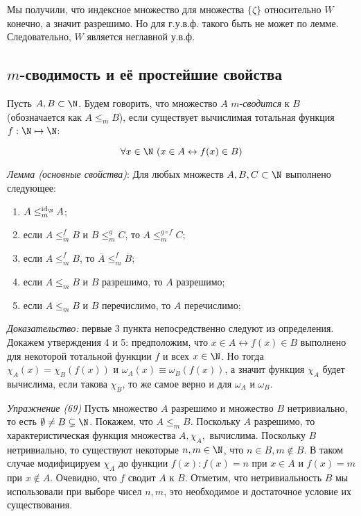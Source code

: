 \documentclass[a4paper, 10pt]{article}
\begin{document}
Мы получили, что индексное множество для множества $\{\zeta\}$ относительно $W$ конечно, а значит разрешимо. Но для г.у.в.ф. такого быть не может по лемме. Следовательно, $W$ является неглавной у.в.ф.

\subsection{$m$-сводимость и её простейшие свойства}

Пусть $A, B \subset \N$. Будем говорить, что множество $A$ $m$-\textit{сводится} к $B$ (обозначается как $A \leq_m B$), если существует вычислимая тотальная функция $f: \N \mapsto \N$:

$$ \forall x \in \N \ (x \in A \leftrightarrow f(x) \in B) $$

\hfill

\textit{Лемма (основные свойства)}: Для любых множеств $A, B, C \subset \N$ выполнено следующее:
\begin{enumerate}
	\item{$A \leq_m^{\operatorname{id}_{\N}} A$};
	\item{если $A \leq_m^f B$ и $B \leq_m^g C$, то $A \leq_m^{g \circ f} C$};
	\item{если $A \leq_m^f B$, то $\overline{A} \leq_m^f \overline{B}$};
	\item{если $A \leq_m B$ и $B$ разрешимо, то $A$ разрешимо};
	\item{если $A \leq_m B$ и $B$ перечислимо, то $A$ перечислимо};
\end{enumerate}

\textit{Доказательство:} первые 3 пункта непосредственно следуют из определения. Докажем утверждения 4 и 5: предположим, что $x \in A \leftrightarrow f(x) \in B$ выполнено для некоторой тотальной функции $f$ и всех $x \in \N$. Но тогда $\chi_{A}(x) = \chi_{B}(f(x))$ и $\omega_{A}(x) \equiv \omega_{B}(f(x))$, а значит функция $\chi_{A}$ будет вычислима, если такова $\chi_B$, то же самое верно и для $\omega_{A}$ и $\omega_{B}$.

\hfill

\textit{Упражнение (69)} Пусть множество $A$ разрешимо и множество $B$ нетривиально, то есть $\emptyset \neq B \subsetneq \N$. Покажем, что $A \leq_m B$. 
Поскольку $A$ разрешимо, то характеристическая функция множества $A, \chi_A, $  вычислима. Поскольку $B$ нетривиально, то существуют некоторые $n, m \in \N$, что $n \in B, m \notin B$. В таком случае модифицируем $\chi_A$ до функции $f(x): f(x) = n$ при $x \in A$ и $f(x) = m$ при $x \notin A$. Очевидно, что $f$ сводит $A$ к $B$. Отметим, что нетривиальность $B$ мы использовали при выборе чисел $n, m$, это необходимое и достаточное условие их существования.
\end{document}
